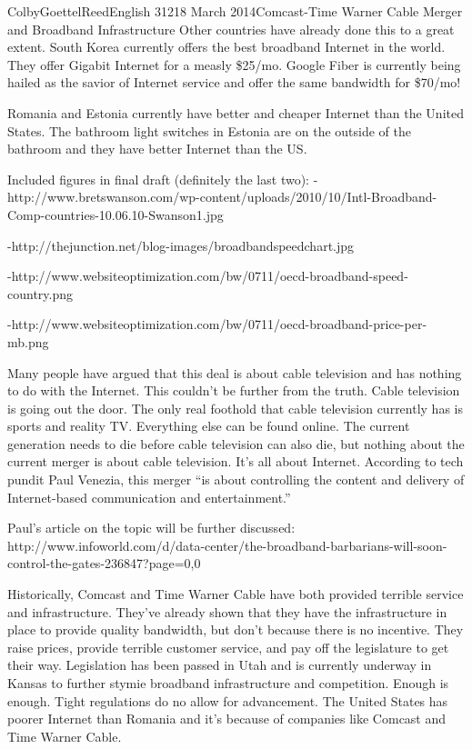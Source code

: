 \documentclass[12pt]{article}
\begin{document}
\begin{mla}{Colby}{Goettel}{Reed}{English 312}{18 March 2014}{Comcast-Time Warner Cable Merger and Broadband Infrastructure}
Other countries have already done this to a great extent. South Korea currently offers the best broadband Internet in the world. They offer Gigabit Internet for a measly \$25/mo. Google Fiber is currently being hailed as the savior of Internet service and offer the same bandwidth for \$70/mo!

Romania and Estonia currently have better and cheaper Internet than the United States. The bathroom light switches in Estonia are on the outside of the bathroom and they have better Internet than the US.

Included figures in final draft (definitely the last two):
-http://www.bretswanson.com/wp-content/uploads/2010/10/Intl-Broadband-Comp-countries-10.06.10-Swanson1.jpg

-http://thejunction.net/blog-images/broadbandspeedchart.jpg

-http://www.websiteoptimization.com/bw/0711/oecd-broadband-speed-country.png

-http://www.websiteoptimization.com/bw/0711/oecd-broadband-price-per-mb.png

Many people have argued that this deal is about cable television and has nothing to do with the Internet. This couldn't be further from the truth. Cable television is going out the door. The only real foothold that cable television currently has is sports and reality TV. Everything else can be found online. The current generation needs to die before cable television can also die, but nothing about the current merger is about cable television. It's all about Internet. According to tech pundit Paul Venezia, this merger ``is about controlling the content and delivery of Internet-based communication and entertainment.''

Paul's article on the topic will be further discussed: http://www.infoworld.com/d/data-center/the-broadband-barbarians-will-soon-control-the-gates-236847?page=0,0

Historically, Comcast and Time Warner Cable have both provided terrible service and infrastructure. They've already shown that they have the infrastructure in place to provide quality bandwidth, but don't because there is no incentive. They raise prices, provide terrible customer service, and pay off the legislature to get their way. Legislation has been passed in Utah and is currently underway in Kansas to further stymie broadband infrastructure and competition. Enough is enough. Tight regulations do no allow for advancement. The United States has poorer Internet than Romania and it's because of companies like Comcast and Time Warner Cable.

\begin{workscited}
    \bibent 
\end{workscited}

\end{mla}
\end{document}
